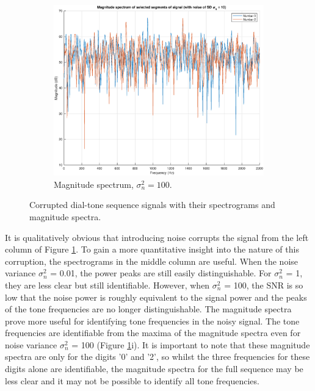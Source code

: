 \begin{figure}[H]
\begin{subfigure}{.32\textwidth}
  \includegraphics[width=\linewidth]{assignment3figs/magspec_sd10.eps}  
  \caption{Magnitude spectrum, $\sigma_{n}^{2} = 100$.}
\end{subfigure}
\caption{Corrupted dial-tone sequence signals with their spectrograms and magnitude spectra.}
\label{fig:noisy}
\end{figure}

\noindent
It is qualitatively obvious that introducing noise corrupts the signal from the left column of Figure \ref{fig:noisy}. To gain a more quantitative insight into the nature of this corruption, the spectrograms in the middle column are useful. When the noise
variance $\sigma_{n}^{2}$ = 0.01, the power peaks are still easily distinguishable. For $\sigma_{n}^{2}$ = 1, they are less clear but still identifiable. However, when $\sigma_{n}^{2}$ = 100, the SNR is so low that the noise power is roughly equivalent to the signal power and the peaks of the tone frequencies are no longer distinguishable. The magnitude spectra prove more useful for identifying tone frequencies in the noisy signal. The tone frequencies are identifiable from the maxima of the magnitude spectra even for noise variance $\sigma_{n}^{2}$ = 100 (Figure \ref{fig:noisy}i). It is important to note that these magnitude spectra are only for the digits '0' and '2', so whilst the three frequencies for these digits alone are identifiable, the magnitude spectra for the full sequence may be less clear and it may not be possible to identify all tone frequencies.


